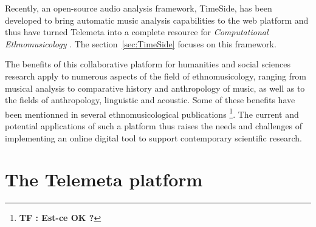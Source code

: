 \documentclass{sig-alternate}
\newcommand{\comment}[1]{\footnote{\color{red} \bf{{#1}}}}
\begin{document}
Recently, an open-source audio analysis framework, TimeSide, has been developed to bring automatic music analysis capabilities to the web platform and thus have turned Telemeta into a complete resource for \emph{Computational Ethnomusicology} \cite{Tzanetakis_2007_JIMS, Gomez_JNMR_2013}. The section~\ref{sec:TimeSide} focuses on this framework.

The benefits of this collaborative platform for humanities and social sciences research apply to numerous aspects of the field of ethnomusicology, ranging from musical analysis to comparative history and anthropology of music, as well as to the fields of anthropology, linguistic and acoustic. {\color{blue} Some of these benefits have been mentionned in several ethnomusicological publications \cite{Simmonot_IASA_2011, Julien_IASA_2011, Simonnot_ICTM_2014}\comment{TF : Est-ce OK ?}}.
The current and potential applications of such a platform thus raises the needs and challenges of implementing an online digital tool to support contemporary scientific research.

 
 \section{The Telemeta platform}\label{sec:Telemeta}
\end{document}
